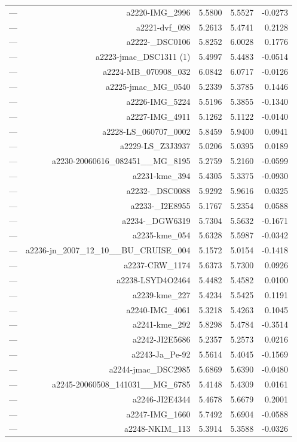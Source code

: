 \begin{table}[htbp]
\begin{tabular}{lrrrr}
— & a2220-IMG_2996 & 5.5800 & 5.5527 & -0.0273 \\
— & a2221-dvf_098 & 5.2613 & 5.4741 & 0.2128 \\
— & a2222-_DSC0106 & 5.8252 & 6.0028 & 0.1776 \\
— & a2223-jmac_DSC1311 (1) & 5.4997 & 5.4483 & -0.0514 \\
— & a2224-MB_070908_032 & 6.0842 & 6.0717 & -0.0126 \\
— & a2225-jmac_MG_0540 & 5.2339 & 5.3785 & 0.1446 \\
— & a2226-IMG_5224 & 5.5196 & 5.3855 & -0.1340 \\
— & a2227-IMG_4911 & 5.1262 & 5.1122 & -0.0140 \\
— & a2228-LS_060707_0002 & 5.8459 & 5.9400 & 0.0941 \\
— & a2229-LS_Z3J3937 & 5.0206 & 5.0395 & 0.0189 \\
— & a2230-20060616_082451__MG_8195 & 5.2759 & 5.2160 & -0.0599 \\
— & a2231-kme_394 & 5.4305 & 5.3375 & -0.0930 \\
— & a2232-_DSC0088 & 5.9292 & 5.9616 & 0.0325 \\
— & a2233-_I2E8955 & 5.1767 & 5.2354 & 0.0588 \\
— & a2234-_DGW6319 & 5.7304 & 5.5632 & -0.1671 \\
— & a2235-kme_054 & 5.6328 & 5.5987 & -0.0342 \\
— & a2236-jn_2007_12_10__BU_CRUISE_004 & 5.1572 & 5.0154 & -0.1418 \\
— & a2237-CRW_1174 & 5.6373 & 5.7300 & 0.0926 \\
— & a2238-LSYD4O2464 & 5.4482 & 5.4582 & 0.0100 \\
— & a2239-kme_227 & 5.4234 & 5.5425 & 0.1191 \\
— & a2240-IMG_4061 & 5.3218 & 5.4263 & 0.1045 \\
— & a2241-kme_292 & 5.8298 & 5.4784 & -0.3514 \\
— & a2242-JI2E5686 & 5.2357 & 5.2573 & 0.0216 \\
— & a2243-Ja_Pe-92 & 5.5614 & 5.4045 & -0.1569 \\
— & a2244-jmac_DSC2985 & 5.6869 & 5.6390 & -0.0480 \\
— & a2245-20060508_141031__MG_6785 & 5.4148 & 5.4309 & 0.0161 \\
— & a2246-JI2E4344 & 5.4678 & 5.6679 & 0.2001 \\
— & a2247-IMG_1660 & 5.7492 & 5.6904 & -0.0588 \\
— & a2248-NKIM_113 & 5.3914 & 5.3588 & -0.0326 \\

\end{tabular}
\end{table}
